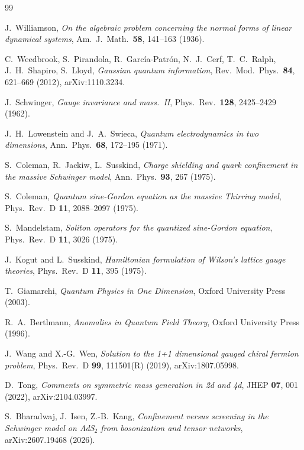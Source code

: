 \begin{thebibliography}{99}

J.~Williamson, \emph{On the algebraic problem concerning the normal forms of linear dynamical systems},
Am.\ J.\ Math.\ \textbf{58}, 141--163 (1936).

C.~Weedbrook, S.~Pirandola, R.~Garc\'ia-Patr\'on, N.~J.~Cerf, T.~C.~Ralph, J.~H.~Shapiro, S.~Lloyd,
\emph{Gaussian quantum information}, Rev.\ Mod.\ Phys.\ \textbf{84}, 621--669 (2012), arXiv:1110.3234.

J.~Schwinger, \emph{Gauge invariance and mass.~II}, Phys.\ Rev.\ \textbf{128}, 2425--2429 (1962).

J.~H.~Lowenstein and J.~A.~Swieca, \emph{Quantum electrodynamics in two dimensions},
Ann.\ Phys.\ \textbf{68}, 172--195 (1971).

S.~Coleman, R.~Jackiw, L.~Susskind, \emph{Charge shielding and quark confinement in the massive Schwinger model},
Ann.\ Phys.\ \textbf{93}, 267 (1975).

S.~Coleman, \emph{Quantum sine-Gordon equation as the massive Thirring model}, Phys.\ Rev.\ D \textbf{11}, 2088--2097 (1975).

S.~Mandelstam, \emph{Soliton operators for the quantized sine-Gordon equation}, Phys.\ Rev.\ D \textbf{11}, 3026 (1975).

J.~Kogut and L.~Susskind, \emph{Hamiltonian formulation of Wilson's lattice gauge theories},
Phys.\ Rev.\ D \textbf{11}, 395 (1975).

T.~Giamarchi, \emph{Quantum Physics in One Dimension}, Oxford University Press (2003).

R.~A.~Bertlmann, \emph{Anomalies in Quantum Field Theory}, Oxford University Press (1996).

J.~Wang and X.-G.~Wen, \emph{Solution to the 1+1 dimensional gauged chiral fermion problem},
Phys.\ Rev.\ D \textbf{99}, 111501(R) (2019), arXiv:1807.05998.

D.~Tong, \emph{Comments on symmetric mass generation in 2d and 4d}, JHEP \textbf{07}, 001 (2022), arXiv:2104.03997.

S.~Bharadwaj, J.~Isen, Z.-B.~Kang, \emph{Confinement versus screening in the Schwinger model on AdS$_2$ from
bosonization and tensor networks}, arXiv:2607.19468 (2026).

\end{thebibliography}
